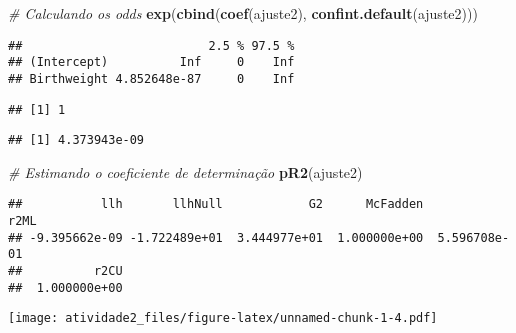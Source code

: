 \documentclass[]{article}
\newenvironment{Shaded}{\begin{snugshade}}{\end{snugshade}}
\newcommand{\CommentTok}[1]{\textcolor[rgb]{0.56,0.35,0.01}{\textit{#1}}}
\newcommand{\DataTypeTok}[1]{\textcolor[rgb]{0.13,0.29,0.53}{#1}}
\newcommand{\KeywordTok}[1]{\textcolor[rgb]{0.13,0.29,0.53}{\textbf{#1}}}
\newcommand{\NormalTok}[1]{#1}
\newcommand{\OperatorTok}[1]{\textcolor[rgb]{0.81,0.36,0.00}{\textbf{#1}}}
\newcommand{\StringTok}[1]{\textcolor[rgb]{0.31,0.60,0.02}{#1}}
\begin{document}
\begin{Shaded}
\begin{Highlighting}[]
\CommentTok{# Calculando os odds}
\KeywordTok{exp}\NormalTok{(}\KeywordTok{cbind}\NormalTok{(}\KeywordTok{coef}\NormalTok{(ajuste2), }\KeywordTok{confint.default}\NormalTok{(ajuste2)))}
\end{Highlighting}
\end{Shaded}

\begin{verbatim}
##                          2.5 % 97.5 %
## (Intercept)          Inf     0    Inf
## Birthweight 4.852648e-87     0    Inf
\end{verbatim}

\begin{Shaded}
\end{Shaded}

\begin{verbatim}
## [1] 1
\end{verbatim}

\begin{Shaded}
\end{Shaded}

\begin{verbatim}
## [1] 4.373943e-09
\end{verbatim}

\begin{Shaded}
\begin{Highlighting}[]
\CommentTok{# Estimando o coeficiente de determinação}
\KeywordTok{pR2}\NormalTok{(ajuste2)}
\end{Highlighting}
\end{Shaded}

\begin{verbatim}
##           llh       llhNull            G2      McFadden          r2ML 
## -9.395662e-09 -1.722489e+01  3.444977e+01  1.000000e+00  5.596708e-01 
##          r2CU 
##  1.000000e+00
\end{verbatim}

\texttt{[image: atividade2\_files/figure-latex/unnamed-chunk-1-4.pdf]}
\end{document}
